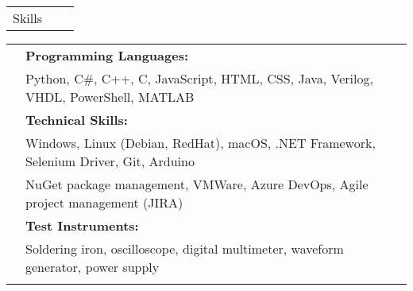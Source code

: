 \documentclass[letterpaper,10pt,oneside]{article}
\begin{document}
 \noindent \begin{tabularx}{\linewidth}{@{} l l R } 
     \Large{Skills}\\
 \end{tabularx}
 \noindent \begin{tabularx}{\linewidth}{@{} l l l }
     &\textbf{Programming Languages:}\\
     & \indent Python, C\#, C++, C, JavaScript, HTML, CSS, Java, Verilog, VHDL, PowerShell, MATLAB \\
     &\textbf{Technical Skills:}\\
     & \indent Windows, Linux (Debian, RedHat), macOS, .NET Framework, Selenium Driver, Git, Arduino\\
     & \indent NuGet package management, VMWare, Azure DevOps, Agile project management (JIRA)\\
     &\textbf{Test Instruments:}\\
     & \indent Soldering iron, oscilloscope, digital multimeter, waveform generator, power supply\\
     \\
 \end{tabularx}
\end{document}

